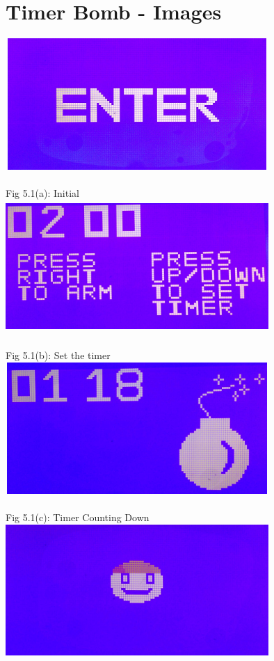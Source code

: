 \documentclass[a4paper,12pt,oneside]{book}
\begin{document}
\section{Timer Bomb - Images}
\begin{center}
\includegraphics[width=10cm, height=5cm]{TimedBombImages/enterScreen} \\
\\ {\small Fig 5.1(a): Initial} \\
\includegraphics[width=10cm, height=5cm]{TimedBombImages/setTimerScreen} \\
\\ {\small Fig 5.1(b): Set the timer} \\
\includegraphics[width=10cm, height=5cm]{TimedBombImages/countdownTimer} \\
\\ {\small Fig 5.1(c): Timer Counting Down} \\
\includegraphics[width=10cm, height=5cm]{TimedBombImages/bombDiffusedScreen} \\

\end{center}
\end{document}
